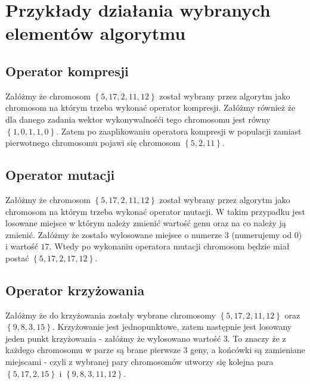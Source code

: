 \documentclass{article}
\begin{document}
\section{Przykłady działania wybranych elementów algorytmu}
\subsection{Operator kompresji}
Załóżmy że chromosom $\left\{5, 17, 2, 11, 12\right\}$ został wybrany przez algorytm jako chromosom na którym trzeba wykonać operator kompresji. Załóżmy również że dla danego zadania wektor wykonywalnośći tego chromosomu jest równy $\left\{1, 0, 1, 1, 0\right\}$. Zatem po zaaplikowaniu operatora kompresji w populacji zamiast pierwotnego chromosomu pojawi się chromosom $\left\{5, 2, 11\right\}$.
\subsection{Operator mutacji}
Załóżmy że chromosom $\left\{5, 17, 2, 11, 12\right\}$ został wybrany przez algorytm jako chromosom na którym trzeba wykonać operator mutacji. W takim przypadku jest losowane miejsce w którym należy zmienić wartość genu oraz na co należy ją zmienić. Załóżmy że zostało wylosowane miejsce o numerze $3$ (numerujemy od $0$) i wartość $17$. Wtedy po wykonaniu operatora mutacji chromosom będzie miał postać $\left\{5, 17, 2, 17, 12\right\}$.
\subsection{Operator krzyżowania}
Załóżmy że do krzyżowania zostały wybrane chromosomy $\left\{5, 17, 2, 11, 12\right\}$ oraz $\left\{9, 8, 3, 15\right\}$. Krzyżowanie jest jednopunktowe, zatem następnie jest losowany jeden punkt krzyżowania - załóżmy że wylosowano wartość $3$. To znaczy że z każdego chromosomu w parze są brane pierwsze $3$ geny, a końcówki są zamieniane miejscami - czyli z wybranej pary chromosomów utworzy się kolejna para $\left\{5, 17, 2, 15\right\}$ i $\left\{9, 8, 3, 11, 12\right\}$.
\end{document}
